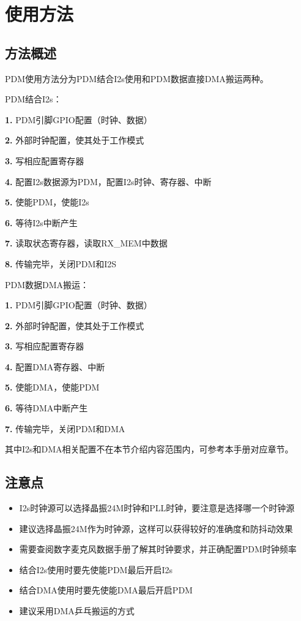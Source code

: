 \documentclass[
  12pt,
]{book}
\begin{document}
\hypertarget{ux4f7fux7528ux65b9ux6cd5-3}{%
\section{使用方法}\label{ux4f7fux7528ux65b9ux6cd5-3}}

\hypertarget{ux65b9ux6cd5ux6982ux8ff0-3}{%
\subsection{方法概述}\label{ux65b9ux6cd5ux6982ux8ff0-3}}

PDM使用方法分为PDM结合I2s使用和PDM数据直接DMA搬运两种。

PDM结合I2s：

\textbf{1.} PDM引脚GPIO配置（时钟、数据）

\textbf{2.} 外部时钟配置，使其处于工作模式

\textbf{3.} 写相应配置寄存器

\textbf{4.} 配置I2s数据源为PDM，配置I2s时钟、寄存器、中断

\textbf{5.} 使能PDM，使能I2s

\textbf{6.} 等待I2s中断产生

\textbf{7.} 读取状态寄存器，读取RX\_MEM中数据

\textbf{8.} 传输完毕，关闭PDM和I2S

PDM数据DMA搬运：

\textbf{1.} PDM引脚GPIO配置（时钟、数据）

\textbf{2.} 外部时钟配置，使其处于工作模式

\textbf{3.} 写相应配置寄存器

\textbf{4.} 配置DMA寄存器、中断

\textbf{5.} 使能DMA，使能PDM

\textbf{6.} 等待DMA中断产生

\textbf{7.} 传输完毕，关闭PDM和DMA

其中I2s和DMA相关配置不在本节介绍内容范围内，可参考本手册对应章节。

\hypertarget{ux6ce8ux610fux70b9-3}{%
\subsection{注意点}\label{ux6ce8ux610fux70b9-3}}

\begin{itemize}
\item
  I2s时钟源可以选择晶振24M时钟和PLL时钟，要注意是选择哪一个时钟源
\item
  建议选择晶振24M作为时钟源，这样可以获得较好的准确度和防抖动效果
\item
  需要查阅数字麦克风数据手册了解其时钟要求，并正确配置PDM时钟频率
\item
  结合I2s使用时要先使能PDM最后开启I2s
\item
  结合DMA使用时要先使能DMA最后开启PDM
\item
  建议采用DMA乒乓搬运的方式
\end{itemize}
\end{document}
